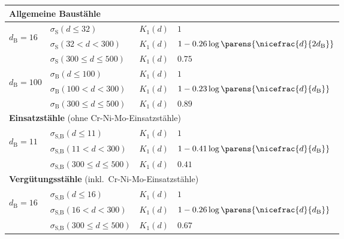 		\begin{center}
			\begin{tabular}{l|lr@{$\:=\:$}l}
				\toprule
				\multicolumn{4}{l}{\textbf{Allgemeine Baustähle}} \\
				\midrule
				\multirow{3}{*}{
				\begin{sideways}
					$d_\text{B} = 16$
				\end{sideways}
				} & $\sigma_\text{S}(d\leq 32)$ & $K_1(d)$ & $1$ \\
				 & $\sigma_\text{S}(32 < d < 300)$ & $K_1(d)$ & $1-0.26 \log \parens{\nicefrac{d}{2d_\text{B}}}$ \\
				 & $\sigma_\text{S}(300 \leq d \leq 500)$ & $K_1(d)$ & $0.75$ \\
				\midrule
				\multirow{3}{*}{
				\begin{sideways}
					$d_\text{B} = 100$
				\end{sideways}
				} & $\sigma_\text{B}(d \leq 100)$ & $K_1(d)$ & $1$ \\
				& $\sigma_\text{B}(100 < d < 300)$ & $K_1(d)$ & $1-0.23\log\parens{\nicefrac{d}{d_\text{B}}}$ \\
				& $\sigma_\text{B}(300 \leq d \leq 500)$ & $K_1(d)$ & $0.89$ \\
				\midrule \midrule
				\multicolumn{4}{l}{\textbf{Einsatzstähle} (ohne Cr-Ni-Mo-Einsatzstähle)} \\
				\midrule
				\multirow{3}{*}{
				\begin{sideways}
					$d_\text{B} = 11$
				\end{sideways}
				} & $\sigma_\text{S,B}(d\leq 11)$ & $K_1(d)$ & $1$ \\
				& $\sigma_\text{S,B}(11 < d < 300)$ & $K_1(d)$ & $1-0.41\log\parens{\nicefrac{d}{d_\text{B}}}$ \\
				& $\sigma_\text{S,B}(300 \leq d \leq 500)$ & $K_1(d)$ & $0.41$ \\
				\midrule \midrule
				\multicolumn{4}{l}{\textbf{Vergütungsstähle} (inkl.~Cr-Ni-Mo-Einsatzstähle)} \\
				\midrule
				\multirow{3}{*}{
				\begin{sideways}
					$d_\text{B} = 16$
				\end{sideways}
				} & $\sigma_\text{S,B}(d\leq 16)$ & $K_1(d)$ & $1$ \\
				& $\sigma_\text{S,B}(16 < d < 300)$ & $K_1(d)$ & $1-0.26\log\parens{\nicefrac{d}{d_\text{B}}}$ \\
				& $\sigma_\text{S,B}(300 \leq d \leq 500)$ & $K_1(d)$ & $0.67$ \\

\end{tabular}
\end{center}

